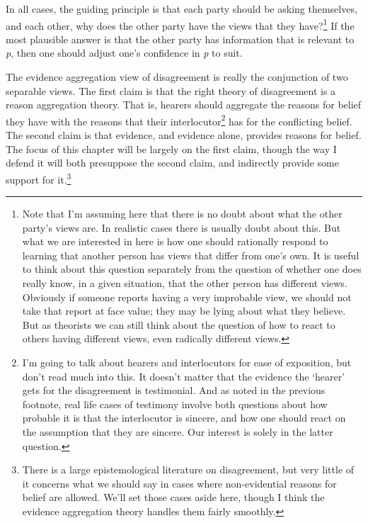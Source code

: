 \documentclass[
  10pt,
  letterpaper,
  twoside]{scrbook}
\begin{document}
In all cases, the guiding principle is that each party should be asking
themselves, and each other, why does the other party have the views that
they have?\footnote{Note that I'm assuming here that there is no doubt
  about what the other party's views are. In realistic cases there is
  usually doubt about this. But what we are interested in here is how
  one should rationally respond to learning that another person has
  views that differ from one's own. It is useful to think about this
  question separately from the question of whether one does really know,
  in a given situation, that the other person has different views.
  Obviously if someone reports having a very improbable view, we should
  not take that report at face value; they may be lying about what they
  believe. But as theorists we can still think about the question of how
  to react to others having different views, even radically different
  views.} If the most plausible answer is that the other party has
information that is relevant to \emph{p}, then one should adjust one's
confidence in \emph{p} to suit.

The evidence aggregation view of disagreement is really the conjunction
of two separable views. The first claim is that the right theory of
disagreement is a reason aggregation theory. That is, hearers should
aggregate the reasons for belief they have with the reasons that their
interlocutor\footnote{I'm going to talk about hearers and interlocutors
  for ease of exposition, but don't read much into this. It doesn't
  matter that the evidence the `hearer' gets for the disagreement is
  testimonial. And as noted in the previous footnote, real life cases of
  testimony involve both questions about how probable it is that the
  interlocutor is sincere, and how one should react on the assumption
  that they are sincere. Our interest is solely in the latter question.}
has for the conflicting belief. The second claim is that evidence, and
evidence alone, provides reasons for belief. The focus of this chapter
will be largely on the first claim, though the way I defend it will both
presuppose the second claim, and indirectly provide some support for
it.\footnote{There is a large epistemological literature on
  disagreement, but very little of it concerns what we should say in
  cases where non-evidential reasons for belief are allowed. We'll set
  those cases aside here, though I think the evidence aggregation theory
  handles them fairly smoothly.}
\end{document}

